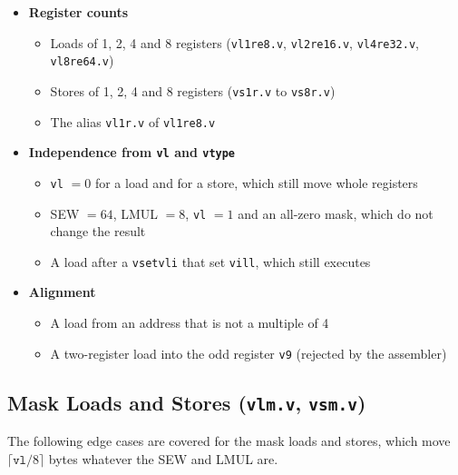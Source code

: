 \documentclass[11pt,a4paper]{article}
\begin{document}
\begin{itemize}
    \item \textbf{Register counts}
    \begin{itemize}
        \item Loads of 1, 2, 4 and 8 registers (\texttt{vl1re8.v}, \texttt{vl2re16.v},
              \texttt{vl4re32.v}, \texttt{vl8re64.v})
        \item Stores of 1, 2, 4 and 8 registers (\texttt{vs1r.v} to \texttt{vs8r.v})
        \item The alias \texttt{vl1r.v} of \texttt{vl1re8.v}
    \end{itemize}

    \item \textbf{Independence from \texttt{vl} and \texttt{vtype}}
    \begin{itemize}
        \item \texttt{vl} $= 0$ for a load and for a store, which still move whole registers
        \item SEW $= 64$, LMUL $= 8$, \texttt{vl} $= 1$ and an all-zero mask, which do not
              change the result
        \item A load after a \texttt{vsetvli} that set \texttt{vill}, which still executes
    \end{itemize}

    \item \textbf{Alignment}
    \begin{itemize}
        \item A load from an address that is not a multiple of 4
        \item A two-register load into the odd register \texttt{v9} (rejected by the assembler)
    \end{itemize}
\end{itemize}

\subsection*{Mask Loads and Stores (\texttt{vlm.v}, \texttt{vsm.v})}
\label{subsec:ldst-mask}

The following edge cases are covered for the mask loads and stores, which move
$\lceil \texttt{vl}/8 \rceil$ bytes whatever the SEW and LMUL are.
\end{document}
